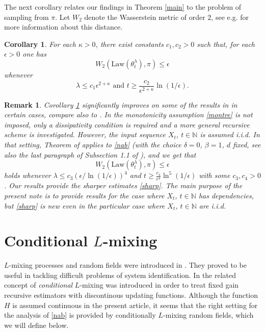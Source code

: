 \documentclass[a4paper,draft]{article}
\newtheorem{corollary}[theorem]{Corollary}
\newtheorem{remark}[theorem]{Remark}
\begin{document}
The next corollary relates our findings in Theorem \ref{main}
to the problem of sampling from $\pi$. Let $W_2$
denote the Wasserstein metric of order $2$, see e.g. \cite{villani}
for more information about this distance.

\begin{corollary}\label{dros} For each $\kappa>0$, there exist constants $c_1,c_2>0$ such that, for each 
$\epsilon>0$ one has
$$
W_2(\mathrm{Law}(\theta^{\lambda}_t),\pi)\leq \epsilon
$$
whenever 
\begin{equation}\label{sharp}
\lambda\leq  c_1\epsilon^{2+\kappa}\mbox{ and }t\geq 
\frac{c_2}{\epsilon^{2+\kappa}}\ln(1/\epsilon).
\end{equation}
\end{corollary}

\begin{remark}{\rm Corollary \ref{dros} significantly improves on
some of the results in \cite{raginsky} in certain cases, compare
also to \cite{xu}.
In \cite{raginsky} the monotonicity assumption \eqref{montre} is not
imposed, only a dissipativity condition is required and a more 
general recursive scheme is investigated. However, the input 
sequence $X_t$, $t\in\mathbb{N}$ is assumed i.i.d. 
In that setting, Theorem of
\cite{raginsky} applies to \eqref{nab} (with the choice $\delta=0$,
$\beta=1$, $d$ fixed, see also the last paragraph of Subsection 1.1
of \cite{raginsky}), and we get that
$$
W_2(\mathrm{Law}(\theta^{\lambda}_t),\pi)\leq \epsilon
$$  
holds whenever 
$\lambda\leq c_3(\epsilon/\ln(1/\epsilon))^4$ and 
$t\geq \frac{c_4}{\epsilon^4}\ln^5(1/\epsilon)$ with some $c_3,c_4>0$. 
Our results provide the sharper estimates \eqref{sharp}. The main
purpose of the present note is to provide results for the case where
$X_t$, $t\in\mathbb{N}$ has dependencies, but \eqref{sharp} is
new even in the particular case where $X_t$, $t\in\mathbb{N}$ are i.i.d.}
\end{remark}

\section{Conditional $L$-mixing}\label{lm}

$L$-mixing processes and random fields
were introduced in \cite{laci1}. They proved to be useful in
tackling difficult problems of system identification. In
\cite{4} the related concept of \emph{conditional} $L$-mixing 
was introduced in order to treat fixed gain recursive estimators
with discontinous updating functions. Although the function $H$
is assumed continuous in the present article, it seems that 
the right setting for the analysis of \eqref{nab} is provided
by conditionally $L$-mixing random fields, which we will define below.
\end{document}
